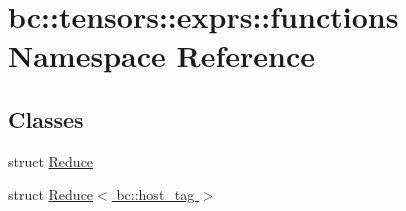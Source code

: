 \hypertarget{namespacebc_1_1tensors_1_1exprs_1_1functions}{}\section{bc\+:\+:tensors\+:\+:exprs\+:\+:functions Namespace Reference}
\label{namespacebc_1_1tensors_1_1exprs_1_1functions}
\subsection*{Classes}
\begin{DoxyCompactItemize}
\item 
struct \hyperlink{structbc_1_1tensors_1_1exprs_1_1functions_1_1Reduce}{Reduce}
\item 
struct \hyperlink{structbc_1_1tensors_1_1exprs_1_1functions_1_1Reduce_3_01bc_1_1host__tag_01_4}{Reduce$<$ bc\+::host\+\_\+tag $>$}
\end{DoxyCompactItemize}
